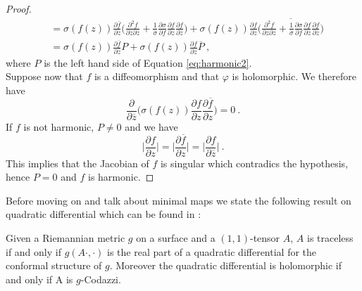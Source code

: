 \begin{proof}
\[\begin{split}
        & = \sigma(f(z)) \frac{\partial \overline{f}}{\partial \overline{z}} \Big( \frac{\partial^2 f}{\partial \overline{z} \partial z} + \frac{1}{\sigma} \frac{\partial \sigma}{\partial f} \frac{\partial f}{\partial \overline{z}} \frac{\partial f}{ \partial z}  \Big) + 
        \sigma(f(z)) \frac{\partial f}{ \partial z} \overline{ \Big(  \frac{\partial^2 f}{\partial \overline{z} \partial z} + \frac{1}{\sigma} \frac{\partial \sigma}{\partial f} \frac{\partial f}{\partial \overline{z}} \frac{\partial f}{ \partial z}  \Big) }  \\
        & = \sigma(f(z)) \frac{\partial \overline{f}}{\partial \overline{z}} P + \sigma(f(z)) \frac{\partial f}{ \partial z} \overline{P} \ ,
    \end{split}
    \]
    where $P$ is the left hand side of Equation \ref{eq:harmonic2}.\\
    Suppose now that $f$ is a diffeomorphism and that $\varphi$ is holomorphic. We therefore have
    \[
    \frac{ \partial}{\partial \overline{z}}\Big(\sigma(f(z)) \frac{\partial f}{ \partial z}  \frac{\partial \overline{f}}{\partial z} \Big) = 0 \ .
    \]
    If $f$ is not harmonic, $P\neq 0$ and we have
    \[
       \Big| \frac{\partial f}{ \partial z} \Big| = \Big| \frac{\partial \overline{f}}{ \partial z} \Big| = \Big| \frac{\partial f}{ \partial \overline{z}} \Big| \ .
    \]
    This implies that the Jacobian of $f$ is singular which contradics the hypothesis, hence $P=0$ and $f$ is harmonic.
\end{proof}
Before moving on and talk about minimal maps we state the following result on quadratic differential which can be found in \cite{taubes2004minimalsurfacesgermshyperbolic}:
\begin{lemma} \label{lem:HQD}
    Given a Riemannian metric $g$ on a surface and a $(1,1)$-tensor $A$, $A$ is traceless if and only if $g(A \cdot, \cdot)$ is the real part of a quadratic differential for the conformal structure of $g$. Moreover the quadratic differential is holomorphic if and only if A is $g$-Codazzi.
\end{lemma}

